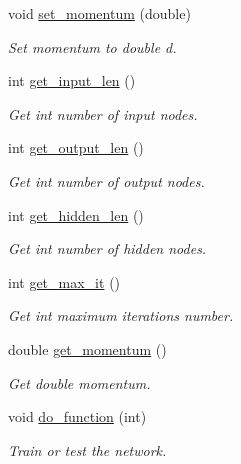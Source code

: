 \begin{DoxyCompactItemize}
void \hyperlink{a00003_af198ad4aa200b431aa45fc17a3895438}{set\-\_\-momentum} (double)
\begin{DoxyCompactList}\small\item\em Set momentum to double d. \end{DoxyCompactList}\item 
int \hyperlink{a00003_a75e25e607afb4e862219b21c0569c893}{get\-\_\-input\-\_\-len} ()
\begin{DoxyCompactList}\small\item\em Get int number of input nodes. \end{DoxyCompactList}\item 
int \hyperlink{a00003_a895c1b35110b7ee5e5adc56a63a55e78}{get\-\_\-output\-\_\-len} ()
\begin{DoxyCompactList}\small\item\em Get int number of output nodes. \end{DoxyCompactList}\item 
int \hyperlink{a00003_ac781308fb521309d657b91a95054be52}{get\-\_\-hidden\-\_\-len} ()
\begin{DoxyCompactList}\small\item\em Get int number of hidden nodes. \end{DoxyCompactList}\item 
int \hyperlink{a00003_aab60f50cc87dc0b740bd843790cf520d}{get\-\_\-max\-\_\-it} ()
\begin{DoxyCompactList}\small\item\em Get int maximum iterations number. \end{DoxyCompactList}\item 
double \hyperlink{a00003_a8aa33e3c123f800aed4c1e7bdc6339d6}{get\-\_\-momentum} ()
\begin{DoxyCompactList}\small\item\em Get double momentum. \end{DoxyCompactList}\item 
void \hyperlink{a00003_acd3d4762d71d54422b45fda3a13976cf}{do\-\_\-function} (int)
\begin{DoxyCompactList}\small\item\em Train or test the network. \end{DoxyCompactList}\end{DoxyCompactItemize}
